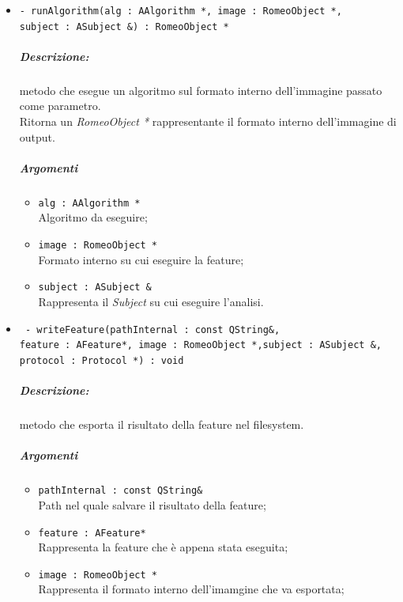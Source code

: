\begin{itemize}
	\item \color{blue}\verb!- runAlgorithm(alg : AAlgorithm *, image : RomeoObject *, !\\
	                            \verb!subject : ASubject &) : RomeoObject *!\\
	\color{black}\subparagraph{Descrizione:} metodo che esegue un algoritmo\g{} sul formato interno dell'immagine passato come parametro.
	\\Ritorna un \textsl{RomeoObject *} rappresentante il formato interno dell'immagine di output.
	\subparagraph{Argomenti}
		\begin{itemize}
			\item \color{RoyalPurple}\verb!alg : AAlgorithm *!\\
					\color{black}Algoritmo da eseguire;
					
			\item \color{RoyalPurple}\verb!image : RomeoObject *!\\
			\color{black}Formato interno su cui eseguire la feature\g{};
		
			\item \color{RoyalPurple}\verb!subject : ASubject &!\\
			\color{black}Rappresenta il \textsl{Subject} su cui eseguire l'analisi.
		\end{itemize}
		
	\item \color{blue}\verb! - writeFeature(pathInternal : const QString&, !\\
								\verb!feature : AFeature*, image : RomeoObject *,subject : ASubject &,!\\
								\verb!protocol : Protocol *) : void!\\
			\color{black}\subparagraph{Descrizione:} metodo che esporta il risultato della feature\g{} nel filesystem.
			\subparagraph{Argomenti}
				\begin{itemize}
					\item \color{RoyalPurple}\verb!pathInternal : const QString&!\\
					\color{black}Path nel quale salvare il risultato della feature\g{};
					
					\item \color{RoyalPurple}\verb!feature : AFeature*!\\
					\color{black}Rappresenta la feature\g{} che è appena stata eseguita;
					
					\item \color{RoyalPurple}\verb!image : RomeoObject *!\\
					\color{black}Rappresenta il formato interno dell'imamgine che va esportata;
					

\end{itemize}
\end{itemize}
